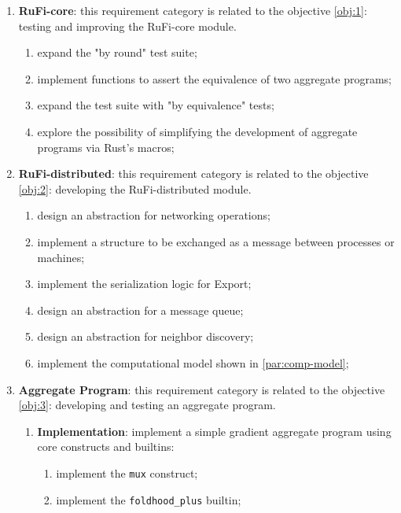 \begin{enumerate}
    \item \textbf{RuFi-core}: this requirement category is related to the objective \ref{obj:1}: testing and improving the RuFi-core module.
          \begin{enumerate}
              \item expand the "by round" test suite;
              \item implement functions to assert the equivalence of two aggregate programs;
              \item expand the test suite with "by equivalence" tests;
              \item explore the possibility of simplifying the development of aggregate programs via Rust's macros;
          \end{enumerate}
    \item \textbf{RuFi-distributed}: this requirement category is related to the objective \ref{obj:2}: developing the RuFi-distributed module.
          \begin{enumerate}
              \item design an abstraction for networking operations;
              \item implement a structure to be exchanged as a message between processes or machines;
              \item implement the serialization logic for Export;
              \item design an abstraction for a message queue;
              \item design an abstraction for neighbor discovery;
              \item implement the computational model shown in \ref{par:comp-model};
          \end{enumerate}
    \item \textbf{Aggregate Program}: this requirement category is related to the objective \ref{obj:3}: developing and testing an aggregate program.
          \begin{enumerate}
              \item \textbf{Implementation}: implement a simple gradient aggregate program using core constructs and builtins:
                    \begin{enumerate}
                        \item implement the \texttt{mux} construct;
                        \item implement the \texttt{foldhood\_plus} builtin;

\end{enumerate}
\end{enumerate}
\end{enumerate}
